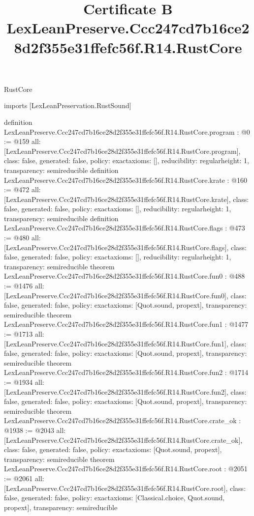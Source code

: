 \begin{lexlean}{RustCore}
\title{Certificate B LexLeanPreserve.Ccc247cd7b16ce28d2f355e31ffefc56f.R14.RustCore}
\begin{coremodule}
imports [LexLeanPreservation.RustSound]

definition LexLeanPreserve.Ccc247cd7b16ce28d2f355e31ffefc56f.R14.RustCore.program : @0 := @159 {
  all: [LexLeanPreserve.Ccc247cd7b16ce28d2f355e31ffefc56f.R14.RustCore.program],
  class: false,
  generated: false,
  policy: exact{axioms: []},
  reducibility: regular{height: 1},
  transparency: semireducible
}
definition LexLeanPreserve.Ccc247cd7b16ce28d2f355e31ffefc56f.R14.RustCore.krate : @160 := @472 {
  all: [LexLeanPreserve.Ccc247cd7b16ce28d2f355e31ffefc56f.R14.RustCore.krate],
  class: false,
  generated: false,
  policy: exact{axioms: []},
  reducibility: regular{height: 1},
  transparency: semireducible
}
definition LexLeanPreserve.Ccc247cd7b16ce28d2f355e31ffefc56f.R14.RustCore.flags : @473 := @480 {
  all: [LexLeanPreserve.Ccc247cd7b16ce28d2f355e31ffefc56f.R14.RustCore.flags],
  class: false,
  generated: false,
  policy: exact{axioms: []},
  reducibility: regular{height: 1},
  transparency: semireducible
}
theorem LexLeanPreserve.Ccc247cd7b16ce28d2f355e31ffefc56f.R14.RustCore.fun0 : @488 := @1476 {
  all: [LexLeanPreserve.Ccc247cd7b16ce28d2f355e31ffefc56f.R14.RustCore.fun0],
  class: false,
  generated: false,
  policy: exact{axioms: [Quot.sound, propext]},
  transparency: semireducible
}
theorem LexLeanPreserve.Ccc247cd7b16ce28d2f355e31ffefc56f.R14.RustCore.fun1 : @1477 := @1713 {
  all: [LexLeanPreserve.Ccc247cd7b16ce28d2f355e31ffefc56f.R14.RustCore.fun1],
  class: false,
  generated: false,
  policy: exact{axioms: [Quot.sound, propext]},
  transparency: semireducible
}
theorem LexLeanPreserve.Ccc247cd7b16ce28d2f355e31ffefc56f.R14.RustCore.fun2 : @1714 := @1934 {
  all: [LexLeanPreserve.Ccc247cd7b16ce28d2f355e31ffefc56f.R14.RustCore.fun2],
  class: false,
  generated: false,
  policy: exact{axioms: [Quot.sound, propext]},
  transparency: semireducible
}
theorem LexLeanPreserve.Ccc247cd7b16ce28d2f355e31ffefc56f.R14.RustCore.crate_ok : @1938 := @2043 {
  all: [LexLeanPreserve.Ccc247cd7b16ce28d2f355e31ffefc56f.R14.RustCore.crate_ok],
  class: false,
  generated: false,
  policy: exact{axioms: [Quot.sound, propext]},
  transparency: semireducible
}
theorem LexLeanPreserve.Ccc247cd7b16ce28d2f355e31ffefc56f.R14.RustCore.root : @2051 := @2061 {
  all: [LexLeanPreserve.Ccc247cd7b16ce28d2f355e31ffefc56f.R14.RustCore.root],
  class: false,
  generated: false,
  policy: exact{axioms: [Classical.choice, Quot.sound, propext]},
  transparency: semireducible
}


\end{coremodule}
\end{lexlean}
